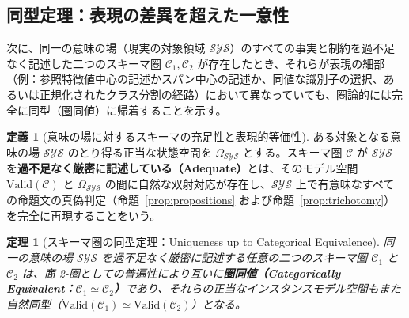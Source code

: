 \documentclass[11pt,a4paper]{ltjsarticle}
\theoremstyle{definition}
\newtheorem{definition}{定義}[section]
\theoremstyle{plain}
\newtheorem{theorem}{定理}[section]
\theoremstyle{remark}
\newcommand{\Valid}{\mathrm{Valid}}
\begin{document}
\subsection{同型定理：表現の差異を超えた一意性}
次に、同一の意味の場（現実の対象領域 $\mathcal{SYS}$）のすべての事実と制約を過不足なく記述した二つのスキーマ圏 $\mathcal{C}_1, \mathcal{C}_2$ が存在したとき、それらが表現の細部（例：参照特徴値中心の記述かスパン中心の記述か、同値な識別子の選択、あるいは正規化されたクラス分割の経路）において異なっていても、圏論的には完全に同型（圏同値）に帰着することを示す。

\begin{definition}[意味の場に対するスキーマの充足性と表現的等価性]\label{def:adequacy}
ある対象となる意味の場 $\mathcal{SYS}$ のとり得る正当な状態空間を $\Omega_{\mathcal{SYS}}$ とする。スキーマ圏 $\mathcal{C}$ が $\mathcal{SYS}$ を\textbf{過不足なく厳密に記述している（Adequate）}とは、そのモデル空間 $\Valid(\mathcal{C})$ と $\Omega_{\mathcal{SYS}}$ の間に自然な双射対応が存在し、$\mathcal{SYS}$ 上で有意味なすべての命題文の真偽判定（命題~\ref{prop:propositions} および命題~\ref{prop:trichotomy}）を完全に再現することをいう。
\end{definition}

\begin{theorem}[スキーマ圏の同型定理：Uniqueness up to Categorical Equivalence]\label{thm:isomorphism}
同一の意味の場 $\mathcal{SYS}$ を過不足なく厳密に記述する任意の二つのスキーマ圏 $\mathcal{C}_1$ と $\mathcal{C}_2$ は、商 2-圏としての普遍性により互いに\textbf{圏同値（Categorically Equivalent：$\mathcal{C}_1 \simeq \mathcal{C}_2$）}であり、それらの正当なインスタンスモデル空間もまた自然同型（$\Valid(\mathcal{C}_1) \simeq \Valid(\mathcal{C}_2)$）となる。
\end{theorem}
\end{document}
